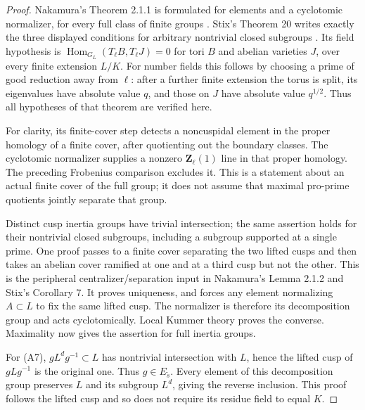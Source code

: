 \documentclass[11pt,oneside]{article}
\begin{document}
\begin{proof}
Nakamura's Theorem 2.1.1 is formulated for elements and a
cyclotomic normalizer, for every full class of finite groups
\cite{A_Nakamura1994}.  Stix's Theorem 20 writes exactly the
three displayed conditions for arbitrary nontrivial closed
subgroups \cite{A_StixCuspidal}.  Its field hypothesis is
$\operatorname{Hom}_{G_L}(T_\ell B,T_\ell J)=0$ for tori
$B$ and abelian varieties $J$, over every finite extension
$L/K$.  For number fields this follows by choosing a prime
of good reduction away from $\ell$: after a further finite
extension the torus is split, its eigenvalues have absolute
value $q$, and those on $J$ have absolute value $q^{1/2}$.
Thus all hypotheses of that theorem are verified here.

For clarity, its finite-cover step detects a noncuspidal
element in the proper homology of a finite cover, after
quotienting out the boundary classes.  The cyclotomic
normalizer supplies a nonzero $\mathbf Z_\ell(1)$ line in
that proper homology.  The preceding Frobenius comparison
excludes it.  This is a statement about an actual finite
cover of the full group; it does not assume that maximal
pro-prime quotients jointly separate that group.

Distinct cusp inertia groups have trivial intersection;
the same assertion holds for their nontrivial closed
subgroups, including a subgroup supported at a single
prime.  One proof passes to a finite cover separating the
two lifted cusps and then takes an abelian cover ramified
at one and at a third cusp but not the other.  This is the
peripheral centralizer/separation input in Nakamura's
Lemma 2.1.2 and Stix's Corollary 7.  It proves uniqueness,
and forces any element normalizing $A\subset L$ to fix
the same lifted cusp.  The normalizer is therefore its
decomposition group and acts cyclotomically.  Local
Kummer theory proves the converse.  Maximality now gives
the assertion for full inertia groups.

For (A7), $gL^dg^{-1}\subset L$ has nontrivial intersection
with $L$, hence the lifted cusp of $gLg^{-1}$ is the
original one.  Thus $g\in E_{\widetilde s}$.  Every element
of this decomposition group preserves $L$ and its subgroup
$L^d$, giving the reverse inclusion.  This proof follows
the lifted cusp and so does not require its residue field
to equal $K$.
\end{proof}
\end{document}
